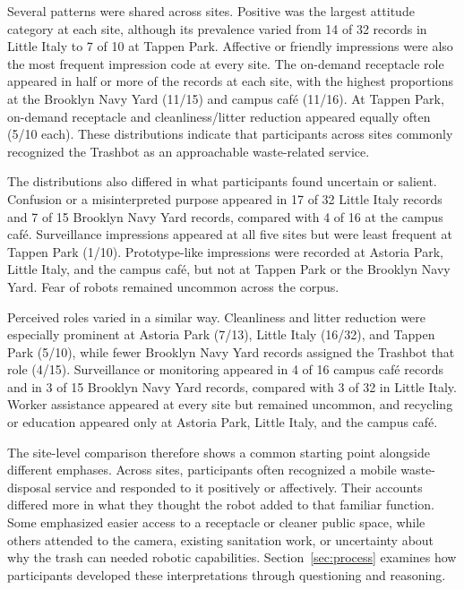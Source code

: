 Several patterns were shared across sites. Positive was the largest attitude category at each site, although its prevalence varied from 14 of 32 records in Little Italy to 7 of 10 at Tappen Park. Affective or friendly impressions were also the most frequent impression code at every site. The on-demand receptacle role appeared in half or more of the records at each site, with the highest proportions at the Brooklyn Navy Yard (11/15) and campus caf\'e (11/16). At Tappen Park, on-demand receptacle and cleanliness/litter reduction appeared equally often (5/10 each). These distributions indicate that participants across sites commonly recognized the Trashbot as an approachable waste-related service.

The distributions also differed in what participants found uncertain or salient. Confusion or a misinterpreted purpose appeared in 17 of 32 Little Italy records and 7 of 15 Brooklyn Navy Yard records, compared with 4 of 16 at the campus caf\'e. Surveillance impressions appeared at all five sites but were least frequent at Tappen Park (1/10). Prototype-like impressions were recorded at Astoria Park, Little Italy, and the campus caf\'e, but not at Tappen Park or the Brooklyn Navy Yard. Fear of robots remained uncommon across the corpus.

Perceived roles varied in a similar way. Cleanliness and litter reduction were especially prominent at Astoria Park (7/13), Little Italy (16/32), and Tappen Park (5/10), while fewer Brooklyn Navy Yard records assigned the Trashbot that role (4/15). Surveillance or monitoring appeared in 4 of 16 campus caf\'e records and in 3 of 15 Brooklyn Navy Yard records, compared with 3 of 32 in Little Italy. Worker assistance appeared at every site but remained uncommon, and recycling or education appeared only at Astoria Park, Little Italy, and the campus caf\'e.

The site-level comparison therefore shows a common starting point alongside different emphases. Across sites, participants often recognized a mobile waste-disposal service and responded to it positively or affectively. Their accounts differed more in what they thought the robot added to that familiar function. Some emphasized easier access to a receptacle or cleaner public space, while others attended to the camera, existing sanitation work, or uncertainty about why the trash can needed robotic capabilities. Section~\ref{sec:process} examines how participants developed these interpretations through questioning and reasoning.

